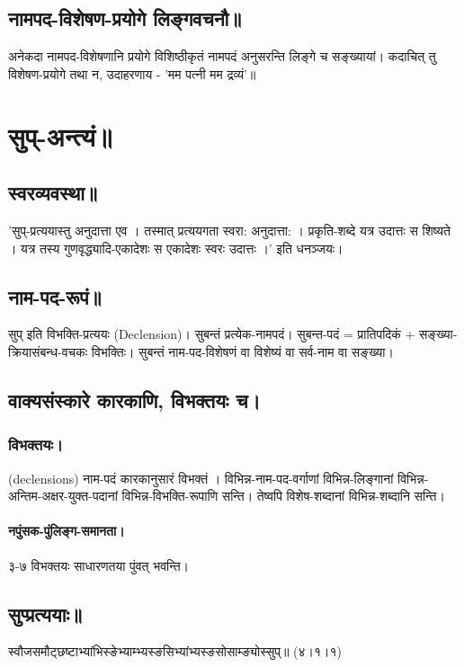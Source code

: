 \documentclass[oneside, article]{memoir}
\begin{document}
\section{नामपद-विशेषण-प्रयोगे लिङ्गवचनौ॥}
अनेकदा नामपद-विशेषणानि प्रयोगे विशिष्ठीकृतं नामपदं अनुसरन्ति लिङ्गे च सङ्ख्यायां। कदाचित् तु विशेषण-प्रयोगे तथा न, उदाहरणाय - 'मम पत्नी मम द्रव्यं'॥

\chapter{सुप्-अन्त्यं॥}
\section{स्वरव्यवस्था॥}
'सुप्-प्रत्ययास्तु अनुदात्ता एव । तस्मात् प्रत्ययगता स्वरा: अनुदात्ता: । प्रकृति-शब्दे यत्र उदात्तः स शिष्यते । यत्र तस्य गुणवृद्ध्यादि-एकादेशः स एकादेशः स्वरः उदात्तः ।' इति धनञ्जयः।

\section{नाम-पद-रूपं॥}
सुप् इति विभक्ति-प्रत्ययः (Declension)। सुबन्तं प्रत्येक-नामपदं। सुबन्त-पदं = प्रातिपदिकं + सङ्ख्या-क्रियासंबन्ध-वचकः विभक्तिः। सुबन्तं नाम-पद-विशेषणं वा विशेष्यं वा सर्व-नाम वा सङ्ख्या।

\section{वाक्यसंस्कारे कारकाणि, विभक्तयः च।}
\subsection{विभक्तयः।}
(declensions) नाम-पदं कारकानुसारं विभक्तं । विभिन्न-नाम-पद-वर्गाणां विभिन्न-लिङ्गानां विभिन्न-अन्तिम-अक्षर-युक्त-पदानां विभिन्न-विभक्ति-रूपाणि सन्ति। तेष्वपि विशेष-शब्दानां विभिन्न-शब्दानि सन्ति।

\subsubsection{नपुंसक-पुंलिङ्ग-समानता।}
३-७ विभक्तयः साधारणतया पुंवत् भवन्ति।

\section{सुप्प्रत्ययाः॥}
स्वौजसमौट्छष्टाभ्यांभिस्ङेभ्याम्भ्यस्ङसिभ्यांभ्यस्ङसोसाम्ङ्योस्सुप्॥ (४।१।१)
\end{document}
